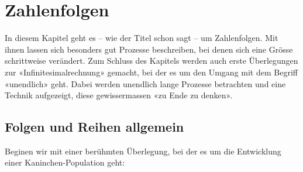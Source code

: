 \graphicspath{{{media/}}}
\section{Zahlenfolgen}
In diesem Kapitel geht es – wie der Titel schon sagt – um Zahlenfolgen.
Mit ihnen lassen sich besonders gut Prozesse beschreiben, bei denen sich eine Grösse schrittweise verändert.
Zum Schluss des Kapitels werden auch erste Überlegungen zur «Infinitesimalrechnung» gemacht, 
bei der es um den Umgang mit dem Begriff «unendlich» geht. Dabei werden unendlich lange Prozesse
betrachten und eine Technik aufgezeigt, diese gewissermassen «zu Ende zu denken».
 

\subsection{Folgen und Reihen allgemein}
Beginen wir mit einer berühmten Überlegung,
bei der es um die Entwicklung einer Kaninchen-Population geht:
